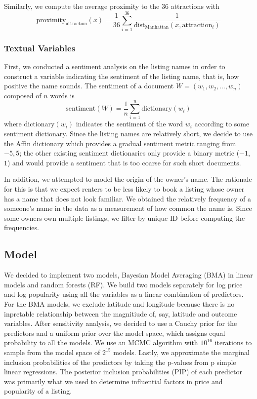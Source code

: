 \documentclass[10pt]{jmlr}%
\begin{document}
Similarly, we compute the average proximity to the $36$ attractions with
$$\text{proximity}_\text{attraction}(x) = \dfrac{1}{36} \sum_{i=1}^{36} \dfrac{1}{\text{dist}_{\text{Manhattan}}(x,\text{attraction}_i)}$$

\subsubsection{Textual Variables}
First, we conducted a sentiment analysis on the listing names in order to construct a variable indicating the sentiment of the listing name, that is, how positive the name sounds. The sentiment of a document $W = (w_1, w_2, \dots, w_n)$ composed of $n$ words is
$$\text{sentiment}(W) = \dfrac{1}{n} \sum_{i=1}^{n} \text{dictionary}(w_i)$$
where $\text{dictionary}(w_i)$ indicates the sentiment of the word $w_i$ according to some sentiment dictionary. Since the listing names are relatively short, we decide to use the Affin dictionary which provides a gradual sentiment metric ranging from $-5, 5$; the other existing sentiment dictionaries only provide a binary metric ($-1$, $1$) and would provide a sentiment that is too coarse for such short documents.

In addition, we attempted to model the origin of the owner's name. The rationale for this is that we expect renters to be less likely to book a listing whose owner has a name that does not look familiar. We obtained the relatively frequency of a someone's name in the data as a measurement of how common the name is. Since some owners own multiple listings, we filter by unique ID before computing the frequencies.



\subsection{Model}
We decided to implement two models, Bayesian Model Averaging (BMA) in linear models and random forests (RF). We build two models separately for log price and log popularity using all the variables as a linear combination of predictors. For the BMA models, we exclude latitude and longitude because there is no inpretable relationship between the magnitiude of, say, latitude and outcome variables. After sensitivity analysis, we decided to use a Cauchy prior for the predictors and a uniform prior over the model space, which assigns equal probability to all the models. We use an MCMC algorithm with $10^{16}$ iterations to sample from the model space of $2^{15}$ models. Lastly, we approximate the marginal inclusion probabilities of the predictors by taking the p-values from p simple linear regressions. The posterior inclusion probabilities (PIP) of each predictor was primarily what we used to determine influential factors in price and popularity of a listing. 
\end{document}
